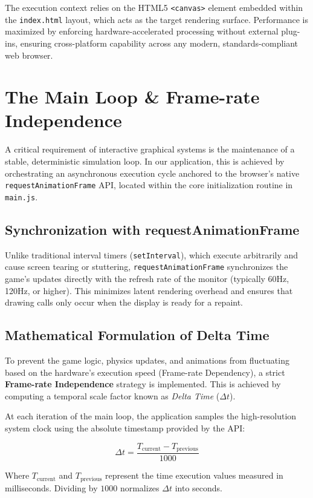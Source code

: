The execution context relies on the HTML5 \texttt{<canvas>} element embedded within the \texttt{index.html} layout, which acts as the target rendering surface. Performance is maximized by enforcing hardware-accelerated processing without external plug-ins, ensuring cross-platform capability across any modern, standards-compliant web browser.

\section{The Main Loop \& Frame-rate Independence}
A critical requirement of interactive graphical systems is the maintenance of a stable, deterministic simulation loop. In our application, this is achieved by orchestrating an asynchronous execution cycle anchored to the browser's native \texttt{requestAnimationFrame} API, located within the core initialization routine in \texttt{main.js}.

\subsection{Synchronization with requestAnimationFrame}
Unlike traditional interval timers (\texttt{setInterval}), which execute arbitrarily and cause screen tearing or stuttering, \texttt{requestAnimationFrame} synchronizes the game's updates directly with the refresh rate of the monitor (typically 60Hz, 120Hz, or higher). This minimizes latent rendering overhead and ensures that drawing calls only occur when the display is ready for a repaint.

\subsection{Mathematical Formulation of Delta Time}
To prevent the game logic, physics updates, and animations from fluctuating based on the hardware's execution speed (Frame-rate Dependency), a strict \textbf{Frame-rate Independence} strategy is implemented. This is achieved by computing a temporal scale factor known as \emph{Delta Time} ($\Delta t$).

At each iteration of the main loop, the application samples the high-resolution system clock using the absolute timestamp provided by the API:

\begin{equation}
    \Delta t = \frac{T_{\text{current}} - T_{\text{previous}}}{1000}
\end{equation}

Where $T_{\text{current}}$ and $T_{\text{previous}}$ represent the time execution values measured in milliseconds. Dividing by $1000$ normalizes $\Delta t$ into seconds. 

